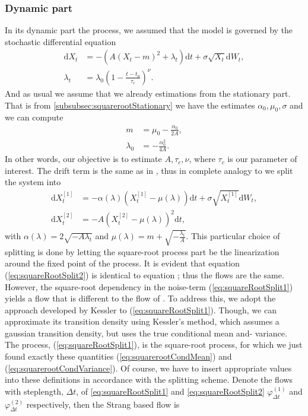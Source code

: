 \subsubsection{Dynamic part}\label{subsubsec:squarerootDynamic}
In its dynamic part the process, we assumed that the model is governed by the stochastic differential equation
\begin{align}
    \mathrm{d}X_t &= -\left(A\left(X_t - m\right)^2 + \lambda_t\right)\mathrm{d}t + \sigma \sqrt{X_t} \mathrm{d}W_t, \label{eq:dynamicsquarerootSDE}\\
    \lambda_t &= \lambda_0\left(1 - \frac{t - t_0}{\tau_c}\right)^\nu.
\end{align}
And as usual we assume that we already estimations from the stationary part. That is from \ref{subsubsec:squarerootStationary} we have the estimates $\alpha_0, \mu_0, \sigma$ and we can compute
\begin{align}
    m &= \mu_0 - \frac{\alpha_0}{2A},\\
    \lambda_0 &= - \frac{\alpha_0^2}{4A}.
\end{align}
In other words, our objective is to estimate $A, \tau_c, \nu$, where $\tau_c$ is our parameter of interest. The drift term is the same as in \cite{Ditlevsen2023}, thus in complete analogy to \cite[(S9, S10)]{DitlevsenSupplementary} we split the system into
\begin{align}
    \mathrm{d}X_t^{[1]} &= -\alpha(\lambda)\left(X_t^{[1]} - \mu(\lambda)\right)  \mathrm{d}t + \sigma \sqrt{X_t^{[1]}} \mathrm{d}W_t, \label{eq:squareRootSplit1} \\
    \mathrm{d}X_t^{[2]} &= - A \left(X_t^{[2]} - \mu(\lambda)\right)^2 \mathrm{d}t, \label{eq:squareRootSplit2}
\end{align}
with $\alpha(\lambda) = 2\sqrt{-A\lambda_t}$ and $\mu(\lambda) = m + \sqrt{-\frac{\lambda_t}{A}}$.
This particular choice of splitting is done by letting the square-root process part be the linearization around the fixed point of the process. It is evident that equation (\ref{eq:squareRootSplit2}) is identical to equation \cite[(S10)]{DitlevsenSupplementary}; thus the flows are the same. However, the square-root dependency in the noise-term (\ref{eq:squareRootSplit1}) yields a flow that is different to the flow of \cite[(S9)]{DitlevsenSupplementary}. To address this, we adopt the approach developed by Kessler \cite{Kessler1997} to (\ref{eq:squareRootSplit1}). Though, we can approximate its transition density using Kessler's method, which assumes a gaussian transition density, but uses the true conditional mean and- variance. The process, (\ref{eq:squareRootSplit1}), is the square-root process, for which we just found exactly these quantities (\ref{eq:squarerootCondMean}) and (\ref{eq:squarerootCondVariance}). Of course, we have to insert appropriate values into these definitions in accordance with the splitting scheme. Denote the flows with steplength, $\Delta t$, of \ref{eq:squareRootSplit1} and \ref{eq:squareRootSplit2} $\varphi_{\Delta t}^{(1)}$ and $\varphi_{\Delta t}^{(2)}$ respectively, then the Strang based flow is 
